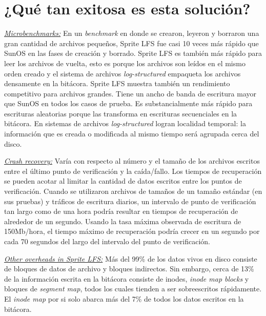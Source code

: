 \section{¿Qué tan exitosa es esta solución?} 
\underline{\emph{Microbenchmarks:}} En un \emph{benchmark} en donde se crearon, leyeron y borraron una gran cantidad de archivos pequeños, Sprite LFS fue casi 10 veces más rápido que SunOS en las fases de creación y borrado. Sprite LFS es también más rápido para leer los archivos de vuelta, esto es porque los archivos son leídos en el mismo orden creado y el sistema de archivos \emph{log-structured} empaqueta los archivos densamente en la bitácora. 
Sprite LFS muestra también un rendimiento competitivo para archivos grandes. Tiene un ancho de banda de escritura mayor que SunOS en todos los casos de prueba. Es substancialmente más rápido para escrituras aleatorias porque las transforma en escrituras secuenciales en la bitácora.
En sistemas de archivos \emph{log-structured} logran localidad temporal: la información que es creada o modificada al mismo tiempo será agrupada cerca del disco. 

\underline{\emph{Crash recovery:}} 
Varía con respecto al número y el tamaño de los archivos escritos entre el último punto de verificación y la caída/fallo. Los tiempos de recuperación se pueden acotar al limitar la cantidad de datos escritos entre los puntos de verificación. Cuando se utilizaron archivos de  tamaños de un tamaño estándar (en sus pruebas) y tráficos de escritura diarios, un intervalo de punto de verificación tan largo como de una hora podría resultar en tiempos de recuperación de alrededor de un segundo. Usando la tasa máxima observada de escritura de 150Mb/hora, el tiempo máximo de recuperación podría crecer en un segundo por cada 70 segundos del largo del intervalo del punto de verificación.

\underline{\emph{Other overheads in Sprite LFS:}}
Más del 99\% de los datos vivos en disco consiste de bloques de datos de archivo y bloques indirectos. Sin embargo, cerca de 13\% de la información escrita en la bitácora consiste de inodes, \emph{inode map blocks} y bloques de \emph{segment map}, todos los cuales tienden a ser sobreescritos rápidamente. El \emph{inode map} por si solo abarca más del 7\% de todos los datos escritos en la bitácora. 
